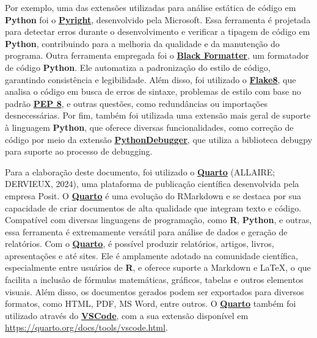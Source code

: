 \documentclass[
  12pt,
  a4paper,
]{scrreprt}
\begin{document}
Por exemplo, uma das extensões utilizadas para análise estática de
código em \textbf{Python} foi o
\href{https://marketplace.visualstudio.com/items?itemName=ms-pyright.pyright}{\textbf{Pyright}},
desenvolvido pela Microsoft. Essa ferramenta é projetada para detectar
erros durante o desenvolvimento e verificar a tipagem de código em
\textbf{Python}, contribuindo para a melhoria da qualidade e da
manutenção do programa. Outra ferramenta empregada foi o
\href{https://marketplace.visualstudio.com/items?itemName=ms-python.black-formatter}{\textbf{Black
Formatter}}, um formatador de código \textbf{Python}. Ele automatiza a
padronização do estilo de código, garantindo consistência e
legibilidade. Além disso, foi utilizado o
\href{https://marketplace.visualstudio.com/items?itemName=ms-python.flake8}{\textbf{Flake8}},
que analisa o código em busca de erros de sintaxe, problemas de estilo
com base no padrão \href{https://peps.python.org/pep-0008/}{\textbf{PEP
8}}, e outras questões, como redundâncias ou importações desnecessárias.
Por fim, também foi utilizada uma extensão mais geral de suporte à
linguagem \textbf{Python}, que oferece diversas funcionalidades, como
correção de código por meio da extensão
\href{https://marketplace.visualstudio.com/items?itemName=ms-python.debugpy}{\textbf{PythonDebugger}},
que utiliza a biblioteca debugpy para suporte ao processo de debugging.

\vspace{12pt}

Para a elaboração deste documento, foi utilizado o
\href{https://quarto.org/}{\textbf{Quarto}} (ALLAIRE; DERVIEUX, 2024),
uma plataforma de publicação científica desenvolvida pela empresa Posit.
O \href{https://quarto.org/}{\textbf{Quarto}} é uma evolução do
RMarkdown e se destaca por sua capacidade de criar documentos de alta
qualidade que integram texto e código. Compatível com diversas
linguagens de programação, como \textbf{R}, \textbf{Python}, e outras,
essa ferramenta é extremamente versátil para análise de dados e geração
de relatórios. Com o \href{https://quarto.org/}{\textbf{Quarto}}, é
possível produzir relatórios, artigos, livros, apresentações e até
sites. Ele é amplamente adotado na comunidade científica, especialmente
entre usuários de \textbf{R}, e oferece suporte a Markdown e \LaTeX, o
que facilita a inclusão de fórmulas matemáticas, gráficos, tabelas e
outros elementos visuais. Além disso, os documentos gerados podem ser
exportados para diversos formatos, como HTML, PDF, MS Word, entre
outros. O \href{https://quarto.org/}{\textbf{Quarto}} também foi
utilizado através do
\href{https://code.visualstudio.com/}{\textbf{VSCode}}, com a sua
extensão disponível em \url{https://quarto.org/docs/tools/vscode.html}.
\end{document}
